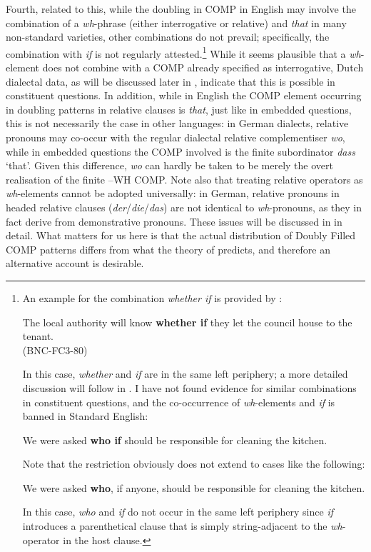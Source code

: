 Fourth, related to this, while the doubling in COMP in English may involve the combination of a \textit{wh}-phrase (either interrogative or relative) and \textit{that} in many non-standard varieties, other combinations do not prevail; specifically, the combination with \textit{if} is not regularly attested.\footnote{An example for the combination \textit{whether if} is provided by \citet[96, ex. 82]{vangelderen2004}:

\ea The local authority will know \textbf{whether if} they let the council house to the tenant.\\
(BNC-FC3-80)
\z

In this case, \textit{whether} and \textit{if} are in the same left periphery; a more detailed discussion will follow in . I have not found evidence for similar combinations in constituent questions, and the co-occurrence of \textit{wh}-elements and \textit{if} is banned in Standard English:

\ea *We were asked \textbf{who if} should be responsible for cleaning the kitchen.
\z

Note that the restriction obviously does not extend to cases like the following:

\ea We were asked \textbf{who}, if anyone, should be responsible for cleaning the kitchen.
\z

In this case, \textit{who} and \textit{if} do not occur in the same left periphery since \textit{if} introduces a parenthetical clause that is simply string-adjacent to the \textit{wh}-operator in the host clause.} While it seems plausible that a \textit{wh}-element does not combine with a COMP already specified as interrogative, Dutch dialectal data, as will be discussed later in , indicate that this is possible in constituent questions. In addition, while in English the COMP element occurring in doubling patterns in relative clauses is \textit{that}, just like in embedded questions, this is not necessarily the case in other languages: in German dialects, relative pronouns may co-occur with the regular dialectal relative complementiser \textit{wo}, while in embedded questions the COMP involved is the finite subordinator \textit{dass} `that'. Given this difference, \textit{wo} can hardly be taken to be merely the overt realisation of the finite --WH COMP. Note also that treating relative operators as \textit{wh}-elements cannot be adopted universally: in German, relative pronouns in headed relative clauses (\textit{der}/\textit{die}/\textit{das}) are not identical to \textit{wh}-pronouns, as they in fact derive from demonstrative pronouns. These issues will be discussed in  in detail. What matters for us here is that the actual distribution of Doubly Filled COMP patterns differs from what the theory of \citet{chomskylasnik1977} predicts, and therefore an alternative account is desirable.

